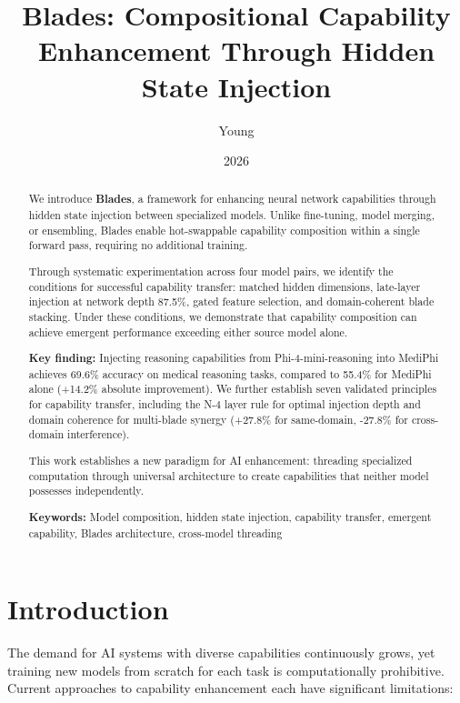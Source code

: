 \documentclass[11pt,a4paper]{article}
\title{\Large \textbf{Blades: Compositional Capability Enhancement Through Hidden State Injection}}
\author{Young}
\date{2026}
\begin{document}
\maketitle

\begin{abstract}

We introduce \textbf{Blades}, a framework for enhancing neural network capabilities through hidden state injection between specialized models. Unlike fine-tuning, model merging, or ensembling, Blades enable hot-swappable capability composition within a single forward pass, requiring no additional training.

Through systematic experimentation across four model pairs, we identify the conditions for successful capability transfer: matched hidden dimensions, late-layer injection at network depth 87.5\%, gated feature selection, and domain-coherent blade stacking. Under these conditions, we demonstrate that capability composition can achieve emergent performance exceeding either source model alone.

\textbf{Key finding:} Injecting reasoning capabilities from Phi-4-mini-reasoning into MediPhi achieves 69.6\% accuracy on medical reasoning tasks, compared to 55.4\% for MediPhi alone (+14.2\% absolute improvement). We further establish seven validated principles for capability transfer, including the N-4 layer rule for optimal injection depth and domain coherence for multi-blade synergy (+27.8\% for same-domain, -27.8\% for cross-domain interference).

This work establishes a new paradigm for AI enhancement: threading specialized computation through universal architecture to create capabilities that neither model possesses independently.

\textbf{Keywords:} Model composition, hidden state injection, capability transfer, emergent capability, Blades architecture, cross-model threading

\end{abstract}

\section{Introduction}

The demand for AI systems with diverse capabilities continuously grows, yet training new models from scratch for each task is computationally prohibitive. Current approaches to capability enhancement each have significant limitations:
\end{document}
